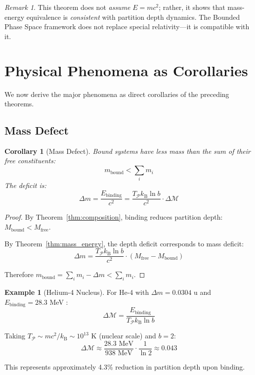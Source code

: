 \documentclass[twocolumn,10pt,a4paper]{article}
\newtheorem{corollary}[theorem]{Corollary}
\theoremstyle{definition}
\newtheorem{example}[theorem]{Example}
\theoremstyle{remark}
\newtheorem{remark}[theorem]{Remark}
\newcommand{\kB}{k_{\mathrm{B}}}
\newcommand{\Partition}{\mathcal{P}}
\newcommand{\Depth}{\mathcal{M}}
\newcommand{\Mfree}{M_{\mathrm{free}}}
\newcommand{\Mbound}{M_{\mathrm{bound}}}
\begin{document}
\begin{remark}
This theorem does not \emph{assume} $E = mc^2$; rather, it shows that mass-energy equivalence is \emph{consistent} with partition depth dynamics. The Bounded Phase Space framework does not replace special relativity---it is compatible with it.
\end{remark}

\section{Physical Phenomena as Corollaries}
\label{sec:corollaries}

We now derive the major phenomena as direct corollaries of the preceding theorems.

\subsection{Mass Defect}

\begin{corollary}[Mass Defect]
\label{cor:mass_defect}
Bound systems have less mass than the sum of their free constituents:
\begin{equation}
    m_{\text{bound}} < \sum_{i} m_i
\end{equation}
The deficit is:
\begin{equation}
    \Delta m = \frac{E_{\text{binding}}}{c^2} = \frac{T_{\Partition} \kB \ln b}{c^2} \cdot \Delta\Depth
\end{equation}
\end{corollary}

\begin{proof}
By Theorem~\ref{thm:composition}, binding reduces partition depth: $\Mbound < \Mfree$.

By Theorem~\ref{thm:mass_energy}, the depth deficit corresponds to mass deficit:
\begin{equation}
    \Delta m = \frac{T_{\Partition} \kB \ln b}{c^2} \cdot (\Mfree - \Mbound)
\end{equation}

Therefore $m_{\text{bound}} = \sum_i m_i - \Delta m < \sum_i m_i$.
\end{proof}

\begin{example}[Helium-4 Nucleus]
For He-4 with $\Delta m = 0.0304$ u and $E_{\text{binding}} = 28.3$ MeV \cite{weizsacker1935,bethe1936}:
\begin{equation}
    \Delta\Depth = \frac{E_{\text{binding}}}{T_{\Partition} \kB \ln b}
\end{equation}

Taking $T_{\Partition} \sim mc^2/\kB \sim 10^{13}$ K (nuclear scale) and $b = 2$:
\begin{equation}
    \Delta\Depth \approx \frac{28.3 \text{ MeV}}{938 \text{ MeV}} \cdot \frac{1}{\ln 2} \approx 0.043
\end{equation}

This represents approximately 4.3\% reduction in partition depth upon binding.
\end{example}
\end{document}
